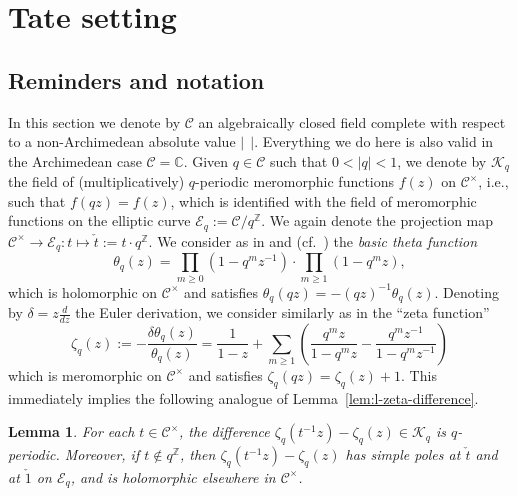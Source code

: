 \documentclass[preprint,12pt]{elsarticle}
\numberwithin{equation}{section} %
\theoremstyle{theorem}
\newtheorem{lemma}[theorem]{Lemma}
\theoremstyle{definition}
\newcommand{\Cq}{\mathcal{C}} %
\newcommand{\bk}{\mathcal{K}} %
\newcommand{\bkq}{\bk_{q}} %
\newcommand{\ec}{\mathcal{E}} %
\newcommand{\ecq}{\ec_{q}}
\newcommand{\C}{\mathbb{C}} %
\newcommand{\Z}{\mathbb{Z}} %
\newcommand{\zq}{\zeta_{q}}
\begin{document}
\section{Tate setting}
\label{sec:tate}
\subsection{Reminders and notation}
\label{subsec:tateNotation}
In this section we denote by $\Cq$ an algebraically closed field complete with respect to a non-Archimedean absolute value $| \ \ |$. Everything we do here is also valid in the Archimedean case $\Cq=\C$. Given $q\in\Cq$ such that $0<|q|<1$, we denote by $\bkq$ the field of (multiplicatively) $q$-periodic meromorphic functions $f(z)$ on $\Cq^\times$, i.e., such that $f(qz)=f(z)$, which is identified with the field of meromorphic functions on the elliptic curve $\ecq:=\Cq/q^\mathbb{Z}$. We again denote the projection map $\Cq^\times\rightarrow\ecq:t\mapsto \check{t}:=t\cdot q^\Z$. We consider as in \cite[\S2]{Roquette} and \cite[\S5.1]{RigidAnalyticGeometry} (cf.~\cite[Prop.~V.3.2]{silvermanAdvanced}) the \emph{basic theta function} \begin{equation} \label{eq:q-theta-def}
    \theta_q(z)=\prod_{m\geq 0}(1-q^mz^{-1})\cdot\prod_{m\geq 1}(1-q^mz),
\end{equation} which is holomorphic on $\Cq^\times$ and satisfies $\theta_q(qz)=-(qz)^{-1}\theta_q(z)$. Denoting by $\delta=z\frac{d}{dz}$ the Euler derivation, we consider similarly as in \cite[\S3]{Roquette} the ``zeta function'' \begin{equation}\label{eq:q-zeta-def}
    \zeta_q(z):=-\frac{\delta\theta_q(z)}{\theta_q(z)}=\frac{1}{1-z}+\sum_{m\geq 1} \left(\frac{q^mz}{1-q^mz}-\frac{q^mz^{-1}}{1-q^mz^{-1}}\right)
\end{equation} which is meromorphic on $\Cq^\times$ and satisfies $\zeta_q(qz)=\zeta_q(z)+1$. This immediately implies the following analogue of Lemma~\ref{lem:l-zeta-difference}.

\begin{lemma}\label{lem:q-zeta-difference}
    For each $t\in\Cq^\times$, the difference $\zq(t^{-1}z)-\zq(z)\in\bkq$ is \mbox{$q$-periodic}. Moreover, if $t\notin q^\Z$, then $\zq(t^{-1}z)-\zq(z)$ has simple poles at $\check{t}$ and at $\check{1}$ on $\ecq$, and is holomorphic elsewhere in $\Cq^\times$.
\end{lemma}
\end{document}
